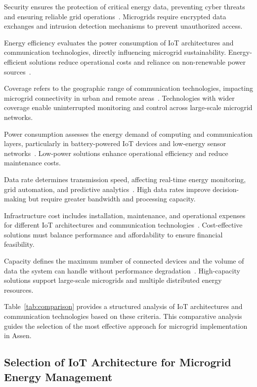\documentclass[conference]{IEEEtran}
\begin{document}
Security ensures the protection of critical energy data, preventing cyber threats and ensuring reliable grid operations~\cite{9823928}. Microgrids require encrypted data exchanges and intrusion detection mechanisms to prevent unauthorized access.

Energy efficiency evaluates the power consumption of IoT architectures and communication technologies, directly influencing microgrid sustainability. Energy-efficient solutions reduce operational costs and reliance on non-renewable power sources~\cite{9257923}.

Coverage refers to the geographic range of communication technologies, impacting microgrid connectivity in urban and remote areas~\cite{8752482}. Technologies with wider coverage enable uninterrupted monitoring and control across large-scale microgrid networks.

Power consumption assesses the energy demand of computing and communication layers, particularly in battery-powered IoT devices and low-energy sensor networks~\cite{smartcities4020024}. Low-power solutions enhance operational efficiency and reduce maintenance costs.

Data rate determines transmission speed, affecting real-time energy monitoring, grid automation, and predictive analytics~\cite{7123563}. High data rates improve decision-making but require greater bandwidth and processing capacity.

Infrastructure cost includes installation, maintenance, and operational expenses for different IoT architectures and communication technologies~\cite{8458217}. Cost-effective solutions must balance performance and affordability to ensure financial feasibility.

Capacity defines the maximum number of connected devices and the volume of data the system can handle without performance degradation~\cite{CloudFogMist2021}. High-capacity solutions support large-scale microgrids and multiple distributed energy resources.

Table~\ref{tab:comparison} provides a structured analysis of IoT architectures and communication technologies based on these criteria. This comparative analysis guides the selection of the most effective approach for microgrid implementation in Assen.

\subsection{Selection of IoT Architecture for Microgrid Energy Management}
\end{document}
